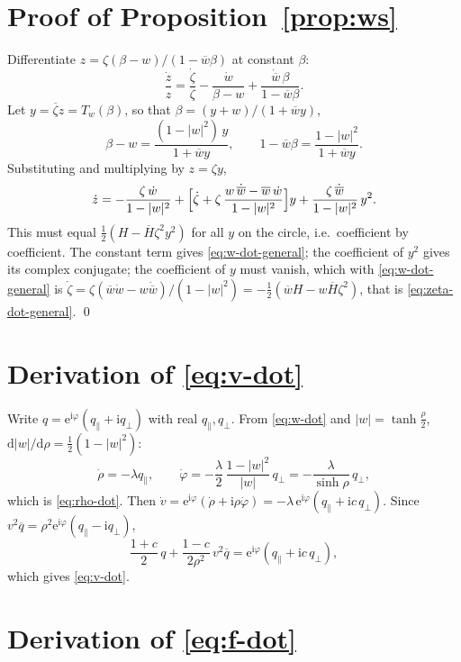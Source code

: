 \documentclass[a4paper,11pt]{article}
\newcommand{\conj}[1]{\overline{#1}}
\newcommand{\T}{T}                       %
\newcommand{\dd}{\mathrm{d}}
\newcommand{\e}{\mathrm{e}}
\newcommand{\ii}{\mathrm{i}}
\theoremstyle{remark}
\begin{document}
\appendix

\section{Proof of Proposition~\ref{prop:ws}}\label{app:ws}

Differentiate $z=\zeta(\beta-w)/(1-\conj w\beta)$ at constant $\beta$:
\[
\frac{\dot z}{z}=\frac{\dot\zeta}{\zeta}-\frac{\dot w}{\beta-w}
+\frac{\dot{\conj w}\,\beta}{1-\conj w\beta}.
\]
Let $y=\conj\zeta z=\T_w(\beta)$, so that $\beta=(y+w)/(1+\conj w y)$,
\[
\beta-w=\frac{(1-|w|^2)\,y}{1+\conj w y},\qquad
1-\conj w\beta=\frac{1-|w|^2}{1+\conj w y}.
\]
Substituting and multiplying by $z=\zeta y$,
\[
\dot z=-\frac{\zeta\,\dot w}{1-|w|^2}
+\Bigl[\dot\zeta+\zeta\,\frac{w\,\dot{\conj w}-\conj w\,\dot w}{1-|w|^2}\Bigr]y
+\frac{\zeta\,\dot{\conj w}}{1-|w|^2}\,y^2 .
\]
This must equal $\tfrac12(H-\conj H\zeta^2y^2)$ for all $y$ on the circle, i.e.\
coefficient by coefficient. The constant term gives
\eqref{eq:w-dot-general}; the coefficient of $y^2$ gives its complex
conjugate; the coefficient of $y$ must vanish, which with
\eqref{eq:w-dot-general} is
$\dot\zeta=\zeta(\conj w\dot w-w\dot{\conj w})/(1-|w|^2)
=-\tfrac12(\conj wH-w\conj H\zeta^2)$, that is \eqref{eq:zeta-dot-general}.
\qed

\section{Derivation of \eqref{eq:v-dot}}\label{app:vdot}

Write $q=\e^{\ii\varphi}(q_\parallel+\ii q_\perp)$ with real
$q_\parallel,q_\perp$. From \eqref{eq:w-dot} and $|w|=\tanh\frac\rho2$,
$\dd|w|/\dd\rho=\tfrac12(1-|w|^2)$:
\[
\dot\rho=-\lambda q_\parallel,\qquad
\dot\varphi=-\frac\lambda2\,\frac{1-|w|^2}{|w|}\,q_\perp
=-\frac{\lambda}{\sinh\rho}\,q_\perp ,
\]
which is \eqref{eq:rho-dot}. Then
$\dot v=\e^{\ii\varphi}(\dot\rho+\ii\rho\dot\varphi)
=-\lambda\,\e^{\ii\varphi}(q_\parallel+\ii c\,q_\perp)$. Since
$v^2\conj q=\rho^2\e^{\ii\varphi}(q_\parallel-\ii q_\perp)$,
\[
\frac{1+c}{2}\,q+\frac{1-c}{2\rho^2}\,v^2\conj q
=\e^{\ii\varphi}(q_\parallel+\ii c\,q_\perp),
\]
which gives \eqref{eq:v-dot}.

\section{Derivation of \eqref{eq:f-dot}}\label{app:fdot}
\end{document}
